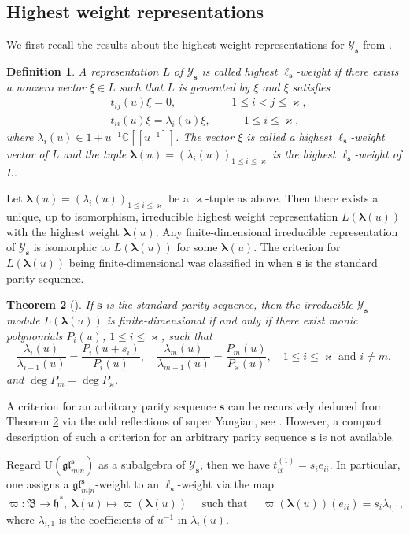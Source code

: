 \documentclass[11pt,reqno]{amsart}
\numberwithin{equation}{section}
\newtheorem{thm}{Theorem}[section]
\newtheorem{dfn}[thm]{Definition}
\theoremstyle{definition}
\theoremstyle{remark}
\newcommand{\beq}{\begin{equation}}
\newcommand{\eeq}{\end{equation}}
\newcommand{\C}{\mathbb{C}}
\newcommand{\h}{\mathfrak{h}}
\newcommand{\lle}{\leqslant}
\newcommand{\la}{\lambda}
\newcommand{\bla}{\bm\lambda}
\newcommand{\glMN}{\mathfrak{gl}_{m|n}^{\bm s}}
\newcommand{\UglMN}{\mathrm{U}(\mathfrak{gl}_{m|n}^\s)}
\newcommand{\YglMN}{\mathscr{Y}_{\bm s}}
\newcommand{\YMN}{{\mathscr{Y}_{\bm s}}}
\newcommand{\ka}{\varkappa}
\newcommand{\s}{{\bm s}}
\begin{document}
\subsection{Highest weight representations}
We first recall the results about the highest weight representations for $\YMN$ from \cite{Zhang1996super}.
\begin{dfn}
A representation $L$ of $\YMN$ is called highest $\ell_\s$-weight if there exists a nonzero vector $\xi\in L$ such that $L$ is generated by $\xi$ and $\xi$ satisfies
\beq\label{eq:highest-Y}
\begin{split}
   & t_{ij}(u)\xi=0,  \qquad \quad\quad \quad 1\lle i<j\lle \ka,\\
   &    t_{ii}(u)\xi=\la_i(u)\xi,\qquad\quad  1\lle i\lle \ka,
\end{split}
\eeq
where $\la_i(u)\in 1+u^{-1}\C[[u^{-1}]]$. The vector $\xi$ is called a {\it highest $\ell_\s$-weight vector} of $L$ and the tuple $\bla(u)=(\la_i(u))_{1\lle i\lle \ka}$ is the {\it highest $\ell_\s$-weight} of $L$.
\end{dfn}

Let $\bla(u)=(\la_i(u))_{1\lle i\lle \ka}$ be a $\ka$-tuple as above. Then there exists a unique, up to isomorphism, irreducible highest weight representation $L(\bla(u))$ with the highest weight $\bla(u)$. Any finite-dimensional irreducible representation of $\YMN$ is isomorphic to $L(\bla(u))$ for some $\bla(u)$. The criterion for $L(\bla(u))$ being finite-dimensional was classified in \cite{Zhang1996super} when $\s$ is the standard parity sequence.

\begin{thm}[\cite{Zhang1996super}]\label{thm:zhang}
If $\s$ is the standard parity sequence, then the irreducible $\YMN$-module $L(\bla(u))$ is finite-dimensional if and only if there exist monic polynomials $P_i(u)$, $1\lle i\lle \ka$, such that
\[
\frac{\la_i(u)}{\la_{i+1}(u)}=\frac{P_i(u+s_i)}{P_i(u)},\quad \frac{\la_m(u)}{\la_{m+1}(u)}=\frac{P_m(u)}{P_{\ka}(u)}, \quad 1\lle i\lle \ka \text{ and } i\ne m,
\]
and $\deg P_m=\deg P_{\ka}$.
\end{thm}

A criterion for an arbitrary parity sequence $\s$ can be recursively deduced from Theorem \ref{thm:zhang} via the odd reflections of super Yangian, see \cite{Molev2022odd,Lu2022note}. However, a compact description of such a criterion for an arbitrary parity sequence $\s$ is not available.

Regard $\UglMN$ as a subalgebra of $\YglMN$, then we have $t_{ii}^{(1)}=s_ie_{ii}$. In particular, one assigns a $\glMN$-weight to an $\ell_\s$-weight via the map
\beq\label{varpi1}
\varpi:\mathfrak B\to \h^*,\ \bm\la(u)\mapsto \varpi(\bm\la(u))\quad \text{ such that } \quad \varpi(\bm\la(u))(e_{ii})=s_i\la_{i,1},
\eeq
where $\la_{i,1}$ is the coefficients of $u^{-1}$ in $\la_i(u)$.
\end{document}
